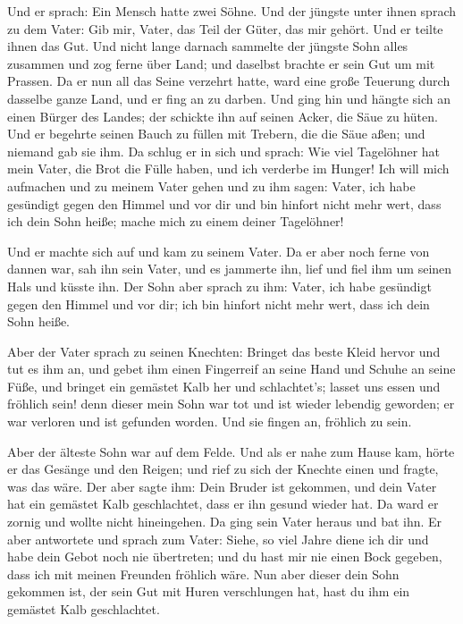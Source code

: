  Und er sprach: Ein Mensch hatte zwei Söhne.
 Und der jüngste unter ihnen sprach zu dem Vater: Gib
mir, Vater, das Teil der Güter, das mir gehört. Und er teilte ihnen das
Gut.  Und nicht lange darnach sammelte der jüngste Sohn
alles zusammen und zog ferne über Land; und daselbst brachte er sein Gut
um mit Prassen.  Da er nun all das Seine verzehrt hatte,
ward eine große Teuerung durch dasselbe ganze Land, und er fing an zu
darben.  Und ging hin und hängte sich an einen Bürger des
Landes; der schickte ihn auf seinen Acker, die Säue zu hüten.
 Und er begehrte seinen Bauch zu füllen mit Trebern, die
die Säue aßen; und niemand gab sie ihm.  Da schlug er in
sich und sprach: Wie viel Tagelöhner hat mein Vater, die Brot die Fülle
haben, und ich verderbe im Hunger!  Ich will mich
aufmachen und zu meinem Vater gehen und zu ihm sagen: Vater, ich habe
gesündigt gegen den Himmel und vor dir  und bin hinfort
nicht mehr wert, dass ich dein Sohn heiße; mache mich zu einem deiner
Tagelöhner!

 Und er machte sich auf und kam zu seinem Vater. Da er
aber noch ferne von dannen war, sah ihn sein Vater, und es jammerte ihn,
lief und fiel ihm um seinen Hals und küsste ihn.  Der
Sohn aber sprach zu ihm: Vater, ich habe gesündigt gegen den Himmel und
vor dir; ich bin hinfort nicht mehr wert, dass ich dein Sohn heiße.

 Aber der Vater sprach zu seinen Knechten: Bringet das
beste Kleid hervor und tut es ihm an, und gebet ihm einen Fingerreif an
seine Hand und Schuhe an seine Füße,  und bringet ein
gemästet Kalb her und schlachtet's; lasset uns essen und fröhlich sein!
 denn dieser mein Sohn war tot und ist wieder lebendig
geworden; er war verloren und ist gefunden worden. Und sie fingen an,
fröhlich zu sein.

 Aber der älteste Sohn war auf dem Felde. Und als er nahe
zum Hause kam, hörte er das Gesänge und den Reigen;  und
rief zu sich der Knechte einen und fragte, was das wäre. 
Der aber sagte ihm: Dein Bruder ist gekommen, und dein Vater hat ein
gemästet Kalb geschlachtet, dass er ihn gesund wieder hat.
 Da ward er zornig und wollte nicht hineingehen. Da ging
sein Vater heraus und bat ihn.  Er aber antwortete und
sprach zum Vater: Siehe, so viel Jahre diene ich dir und habe dein Gebot
noch nie übertreten; und du hast mir nie einen Bock gegeben, dass ich
mit meinen Freunden fröhlich wäre.  Nun aber dieser dein
Sohn gekommen ist, der sein Gut mit Huren verschlungen hat, hast du ihm
ein gemästet Kalb geschlachtet.

